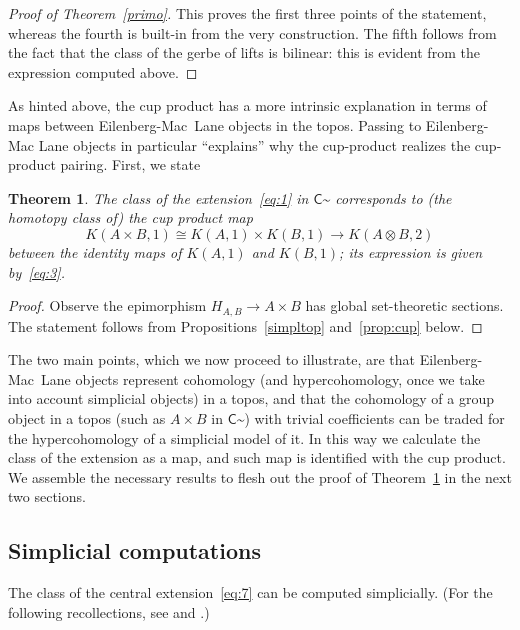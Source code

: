 \documentclass{amsart}
\numberwithin{equation}{subsection}
\newtheorem{theorem}{Theorem}[section]
\theoremstyle{remark}
\theoremstyle{remark}
\newcommand{\too}{\longrightarrow}%
\newcommand{\C}{\mathsf{C}} %
\newcommand{\iso}{\cong}
\newcommand{\shC}{\C\sptilde} %
\begin{document}
\begin{proof}[Proof of Theorem~\ref{primo}]
  This proves the first three points of the statement, whereas the fourth is built-in from the very construction. The fifth follows from the fact that the class of the gerbe of lifts is bilinear: this is evident from the expression computed above.
\end{proof}

As hinted above, the cup product has a more intrinsic explanation in terms of maps between Eilenberg-Mac~Lane objects in the topos. Passing to Eilenberg-Mac Lane objects in particular ``explains'' why the cup-product realizes the cup-product pairing. First, we state
\begin{theorem}
  \label{thm:cup}
  The class of the extension~\eqref{eq:1} in $\shC$ corresponds to (the homotopy class of) the cup product map
  \begin{equation*}
    K(A\times B,1) \iso K(A,1)\times K(B,1) \too K(A\otimes B,2)
  \end{equation*}
  between the identity maps of $K(A,1)$ and $K(B,1)$; its expression is given by~\eqref{eq:3}.
\end{theorem}
\begin{proof}
  Observe the epimorphism $H_{A,B}\to A\times B$ has global set-theoretic sections. The statement follows from Propositions~\ref{simpltop} and~\ref{prop:cup} below.
\end{proof}
The two main points, which we now proceed to illustrate, are that Eilenberg-Mac~Lane objects represent cohomology (and hypercohomology, once we take into account simplicial objects) in a topos, and that the cohomology of a group object in a topos (such as $A\times B$ in $\shC$) with trivial coefficients can be traded for the hypercohomology of a simplicial model of it. In this way we calculate the class of the extension as a map, and such map is identified with the cup product. We assemble the necessary results to flesh out the proof of Theorem~\ref{thm:cup} in the next two sections.

\subsection{Simplicial computations}
\label{sec:simplicial}
The class of the central extension~\eqref{eq:7} can be computed simplicially. (For the following recollections, see \cite[VI.5, VI.6, VI.8]{IllusieII} and \cite[\S 2]{Breen}.)
\end{document}
